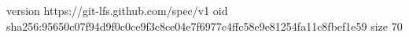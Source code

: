 version https://git-lfs.github.com/spec/v1
oid sha256:95650c07f94d9f0c0ce9f3c8ce04e7f6977c4ffc58e9e81254fa11c8fbef1e59
size 70
